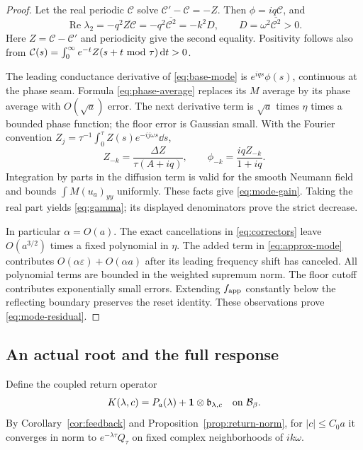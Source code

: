 \begin{proof}
Let the real periodic $\mathcal C$ solve $\mathcal C'-\mathcal C=-Z$.
Then $\phi=iq\mathcal C$, and
\[
 \operatorname{Re}\lambda_2
   =-q^2\overline{Z\mathcal C}
   =-q^2\overline{\mathcal C^2}=-k^2D,\qquad
 D=\omega^2\overline{\mathcal C^2}>0.
\]
Here $Z=\mathcal C-\mathcal C'$ and periodicity give the second equality.
Positivity follows also from
$\mathcal C(s)=\int_0^\infty e^{-t}Z(s+t\ {\rm mod}\ \tau)\,\mathrm d t>0$.

The leading conductance derivative of \eqref{eq:base-mode} is
$e^{iqs}\phi(s)$, continuous at the phase seam. Formula
\eqref{eq:phase-average} replaces its $M$ average by its phase average
with $O(\sqrt a)$ error. The next derivative term is $\sqrt a$ times
$\eta$ times a bounded phase function; the floor error is Gaussian
small. With the Fourier convention
$Z_j=\tau^{-1}\int_0^\tau Z(s)e^{-ij\omega s}\dd s$,
\[
 Z_{-k}=\frac{\Delta Z}{\tau(A+iq)},\qquad
 \phi_{-k}=\frac{iqZ_{-k}}{1+iq}.
\]
Integration by parts in the diffusion term is valid for the smooth
Neumann field and bounds $\int M(u_a)_{yy}$ uniformly. These facts
give \eqref{eq:mode-gain}. Taking the real part yields
\eqref{eq:gamma}; its displayed denominators prove the strict decrease.

In particular $\alpha=O(a)$. The exact cancellations in
\eqref{eq:correctors} leave $O(a^{3/2})$ times a fixed polynomial in
$\eta$. The added term in \eqref{eq:approx-mode} contributes
$O(\alpha\varepsilon)+O(\alpha a)$ after its leading frequency shift
has canceled. All polynomial terms are bounded in the weighted
supremum norm. The floor cutoff contributes exponentially small errors.
Extending $f_{\rm app}$ constantly below the reflecting boundary preserves
the reset identity.
These observations prove \eqref{eq:mode-residual}.
\end{proof}

\subsection{An actual root and the full response}

Define the coupled return operator
\begin{equation}\label{eq:coupled-return}
 K(\lambda,c)=P_a(\lambda)+\mathbf 1\otimes\mathfrak b_{\lambda,c}
                 \quad\hbox{on }\mathcal B_\beta.
\end{equation}
By Corollary~\ref{cor:feedback} and Proposition~\ref{prop:return-norm},
for $|c|\le C_0a$ it converges in norm to
$e^{-\lambda\tau}Q_\tau$ on fixed complex neighborhoods of
$ik\omega$.

